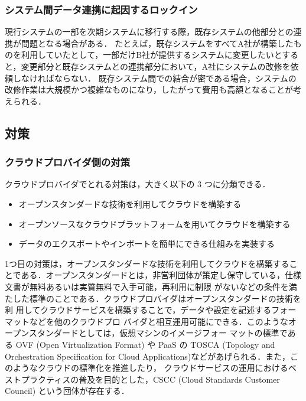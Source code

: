 \subsubsection{システム間データ連携に起因するロックイン}
現行システムの一部を次期システムに移行する際，既存システムの他部分との連携が問題となる場合がある．
たとえば，既存システムをすべてA社が構築したものを利用していたとして，一部だけB社が提供するシステムに変更したいとすると，変更部分と既存システムとの連携部分において，A社にシステムの改修を依頼しなければならない．
既存システム間での結合が密である場合，システムの改修作業は大規模かつ複雑なものになり，したがって費用も高額となることが考えられる．

\subsection{対策}

\subsubsection{クラウドプロバイダ側の対策}
クラウドプロバイダでとれる対策は，大きく以下の 3 つに分類できる．
\begin{itemize}
\item オープンスタンダードな技術を利用してクラウドを構築する
\item オープンソースなクラウドプラットフォームを用いてクラウドを構築する
\item データのエクスポートやインポートを簡単にできる仕組みを実装する
\end{itemize}

1つ目の対策は，オープンスタンダードな技術を利用してクラウドを構築することである．オープンスタンダードとは，非営利団体が策定し保守している，仕様文書が無料あるいは実質無料で入手可能，再利用に制限 がないなどの条件を満たした標準のことである\cite{openstandard}．クラウドプロバイダはオープンスタンダードの技術を利 用してクラウドサービスを構築することで，データや設定を記述するフォーマットなどを他のクラウドプロ バイダと相互運用可能にできる．このようなオープンスタンダードとしては，仮想マシンのイメージフォー マットの標準である OVF (Open Virtualization Format) \cite{ovf}や PaaS の TOSCA (Topology and Orchestration Specification for Cloud Applications)\cite{tosca}などがあげられる．また，このようなクラウドの標準化を推進したり， クラウドサービスの運用におけるベストプラクティスの普及を目的とした，CSCC (Cloud Standards Customer Council) \cite{cscc}という団体が存在する．


